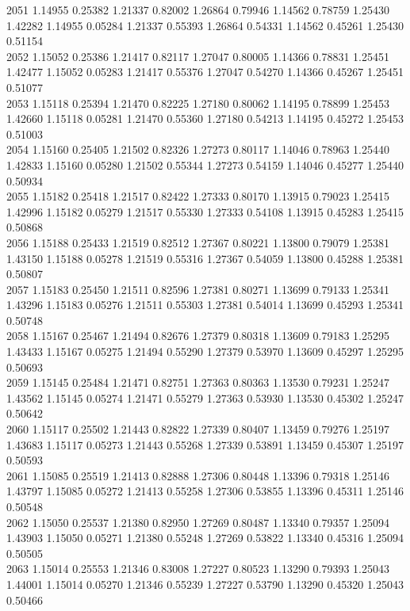 {2051 1.14955 0.25382 1.21337 0.82002 1.26864 0.79946 1.14562 0.78759 1.25430 1.42282 1.14955 0.05284 1.21337 0.55393 1.26864 0.54331 1.14562 0.45261 1.25430 0.51154 \\
2052 1.15052 0.25386 1.21417 0.82117 1.27047 0.80005 1.14366 0.78831 1.25451 1.42477 1.15052 0.05283 1.21417 0.55376 1.27047 0.54270 1.14366 0.45267 1.25451 0.51077 \\
2053 1.15118 0.25394 1.21470 0.82225 1.27180 0.80062 1.14195 0.78899 1.25453 1.42660 1.15118 0.05281 1.21470 0.55360 1.27180 0.54213 1.14195 0.45272 1.25453 0.51003 \\
2054 1.15160 0.25405 1.21502 0.82326 1.27273 0.80117 1.14046 0.78963 1.25440 1.42833 1.15160 0.05280 1.21502 0.55344 1.27273 0.54159 1.14046 0.45277 1.25440 0.50934 \\
2055 1.15182 0.25418 1.21517 0.82422 1.27333 0.80170 1.13915 0.79023 1.25415 1.42996 1.15182 0.05279 1.21517 0.55330 1.27333 0.54108 1.13915 0.45283 1.25415 0.50868 \\
2056 1.15188 0.25433 1.21519 0.82512 1.27367 0.80221 1.13800 0.79079 1.25381 1.43150 1.15188 0.05278 1.21519 0.55316 1.27367 0.54059 1.13800 0.45288 1.25381 0.50807 \\
2057 1.15183 0.25450 1.21511 0.82596 1.27381 0.80271 1.13699 0.79133 1.25341 1.43296 1.15183 0.05276 1.21511 0.55303 1.27381 0.54014 1.13699 0.45293 1.25341 0.50748 \\
2058 1.15167 0.25467 1.21494 0.82676 1.27379 0.80318 1.13609 0.79183 1.25295 1.43433 1.15167 0.05275 1.21494 0.55290 1.27379 0.53970 1.13609 0.45297 1.25295 0.50693 \\
2059 1.15145 0.25484 1.21471 0.82751 1.27363 0.80363 1.13530 0.79231 1.25247 1.43562 1.15145 0.05274 1.21471 0.55279 1.27363 0.53930 1.13530 0.45302 1.25247 0.50642 \\
2060 1.15117 0.25502 1.21443 0.82822 1.27339 0.80407 1.13459 0.79276 1.25197 1.43683 1.15117 0.05273 1.21443 0.55268 1.27339 0.53891 1.13459 0.45307 1.25197 0.50593 \\
2061 1.15085 0.25519 1.21413 0.82888 1.27306 0.80448 1.13396 0.79318 1.25146 1.43797 1.15085 0.05272 1.21413 0.55258 1.27306 0.53855 1.13396 0.45311 1.25146 0.50548 \\
2062 1.15050 0.25537 1.21380 0.82950 1.27269 0.80487 1.13340 0.79357 1.25094 1.43903 1.15050 0.05271 1.21380 0.55248 1.27269 0.53822 1.13340 0.45316 1.25094 0.50505 \\
2063 1.15014 0.25553 1.21346 0.83008 1.27227 0.80523 1.13290 0.79393 1.25043 1.44001 1.15014 0.05270 1.21346 0.55239 1.27227 0.53790 1.13290 0.45320 1.25043 0.50466 \\
}
